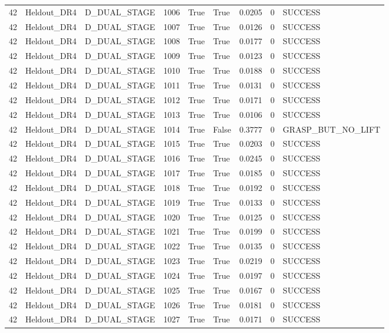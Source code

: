 \documentclass[11pt,a4paper,oneside]{book}
\begin{document}
\begin{longtable}{l l l l l l l l l}
42 & Heldout\_DR4 & D\_DUAL\_STAGE & 1006 & True & True & 0.0205 & 0 & SUCCESS \\
42 & Heldout\_DR4 & D\_DUAL\_STAGE & 1007 & True & True & 0.0126 & 0 & SUCCESS \\
42 & Heldout\_DR4 & D\_DUAL\_STAGE & 1008 & True & True & 0.0177 & 0 & SUCCESS \\
42 & Heldout\_DR4 & D\_DUAL\_STAGE & 1009 & True & True & 0.0123 & 0 & SUCCESS \\
42 & Heldout\_DR4 & D\_DUAL\_STAGE & 1010 & True & True & 0.0188 & 0 & SUCCESS \\
42 & Heldout\_DR4 & D\_DUAL\_STAGE & 1011 & True & True & 0.0131 & 0 & SUCCESS \\
42 & Heldout\_DR4 & D\_DUAL\_STAGE & 1012 & True & True & 0.0171 & 0 & SUCCESS \\
42 & Heldout\_DR4 & D\_DUAL\_STAGE & 1013 & True & True & 0.0106 & 0 & SUCCESS \\
42 & Heldout\_DR4 & D\_DUAL\_STAGE & 1014 & True & False & 0.3777 & 0 & GRASP\_BUT\_NO\_LIFT \\
42 & Heldout\_DR4 & D\_DUAL\_STAGE & 1015 & True & True & 0.0203 & 0 & SUCCESS \\
42 & Heldout\_DR4 & D\_DUAL\_STAGE & 1016 & True & True & 0.0245 & 0 & SUCCESS \\
42 & Heldout\_DR4 & D\_DUAL\_STAGE & 1017 & True & True & 0.0185 & 0 & SUCCESS \\
42 & Heldout\_DR4 & D\_DUAL\_STAGE & 1018 & True & True & 0.0192 & 0 & SUCCESS \\
42 & Heldout\_DR4 & D\_DUAL\_STAGE & 1019 & True & True & 0.0133 & 0 & SUCCESS \\
42 & Heldout\_DR4 & D\_DUAL\_STAGE & 1020 & True & True & 0.0125 & 0 & SUCCESS \\
42 & Heldout\_DR4 & D\_DUAL\_STAGE & 1021 & True & True & 0.0199 & 0 & SUCCESS \\
42 & Heldout\_DR4 & D\_DUAL\_STAGE & 1022 & True & True & 0.0135 & 0 & SUCCESS \\
42 & Heldout\_DR4 & D\_DUAL\_STAGE & 1023 & True & True & 0.0219 & 0 & SUCCESS \\
42 & Heldout\_DR4 & D\_DUAL\_STAGE & 1024 & True & True & 0.0197 & 0 & SUCCESS \\
42 & Heldout\_DR4 & D\_DUAL\_STAGE & 1025 & True & True & 0.0167 & 0 & SUCCESS \\
42 & Heldout\_DR4 & D\_DUAL\_STAGE & 1026 & True & True & 0.0181 & 0 & SUCCESS \\
42 & Heldout\_DR4 & D\_DUAL\_STAGE & 1027 & True & True & 0.0171 & 0 & SUCCESS \\

\end{longtable}
\end{document}
